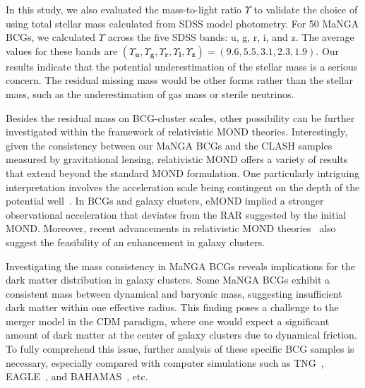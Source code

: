 \documentclass[a4paper, two-column, twocolappendix]{aa}
\begin{document}
In this study, we also evaluated the mass-to-light ratio $\Upsilon$ to validate the choice of using total stellar mass calculated from SDSS model photometry.
For 50 MaNGA BCGs, we calculated $\Upsilon$ across the five SDSS bands: u, g, r, i, and z. 
The average values for these bands are $(\Upsilon_\mathbf{u}, \Upsilon_\mathbf{g}, \Upsilon_\mathbf{r}, \Upsilon_\mathbf{i}, \Upsilon_\mathbf{z})=(9.6, 5.5, 3.1, 2.3, 1.9)$. 
Our results indicate that the potential underestimation of the stellar mass is a serious concern. 
The residual missing mass would be other forms rather than the stellar mass, such as the underestimation of gas mass or sterile neutrinos.


Besides the residual mass on BCG-cluster scales, other possibility can be further investigated within the framework of relativistic MOND theories.
Interestingly, given the consistency between our MaNGA BCGs and the CLASH samples measured by gravitational lensing, relativistic MOND offers a variety of results that extend beyond the standard MOND formulation. 
One particularly intriguing interpretation involves the acceleration scale being contingent on the depth of the potential well~\citep[eMOND;][]{ZF12, HZ17}.
In BCGs and galaxy clusters, eMOND implied a stronger observational acceleration that deviates from the RAR suggested by the initial MOND.
Moreover, recent advancements in relativistic MOND theories~\citep{SZ21, Verwayen23} also suggest the feasibility of an enhancement in galaxy clusters.


Investigating the mass consistency in MaNGA BCGs reveals implications 
 for the dark matter distribution in galaxy clusters.
Some MaNGA BCGs exhibit a consistent mass between dynamical and baryonic mass, 
 suggesting insufficient dark matter within one effective radius. 
This finding poses a challenge to the merger model in the CDM paradigm, 
 where one would expect a significant amount of dark matter at the center of galaxy clusters due to dynamical friction.
To fully comprehend this issue, further analysis of these specific BCG samples is necessary, especially compared with computer simulations such as TNG~\citep{Springel18, Nelson19a, Nelson19b}, EAGLE~\citep{Schaye15, Crain15}, and BAHAMAS~\citep{McCarthy17}, etc.
\end{document}
